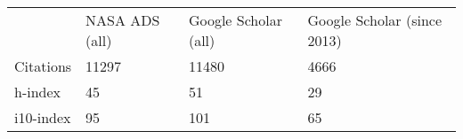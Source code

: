 \begin{tabularx}{\textwidth}{llll}
	&NASA ADS (all) & Google Scholar (all) & Google Scholar (since 2013)\\
Citations&11297&11480	&4666\\
h-index & 45&51&29\\
i10-index & 95 &101	&65\\
\end{tabularx}